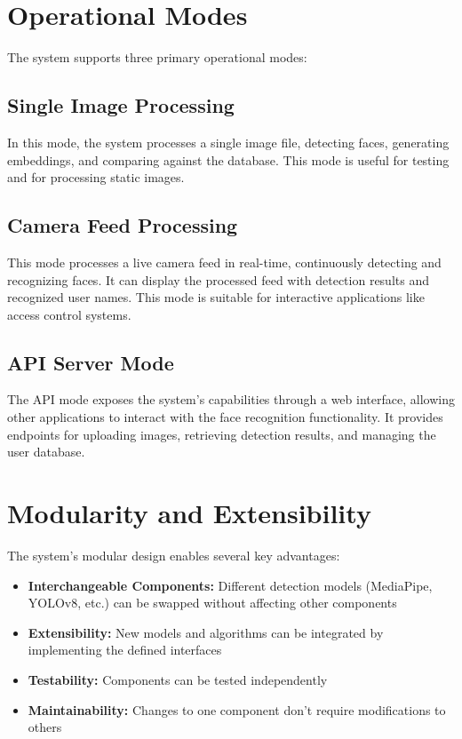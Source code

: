 \section{Operational Modes}
The system supports three primary operational modes:

\subsection{Single Image Processing}
In this mode, the system processes a single image file, detecting faces, generating embeddings, and comparing against the database. This mode is useful for testing and for processing static images.

\subsection{Camera Feed Processing}
This mode processes a live camera feed in real-time, continuously detecting and recognizing faces. It can display the processed feed with detection results and recognized user names. This mode is suitable for interactive applications like access control systems.

\subsection{API Server Mode}
The API mode exposes the system's capabilities through a web interface, allowing other applications to interact with the face recognition functionality. It provides endpoints for uploading images, retrieving detection results, and managing the user database.

\section{Modularity and Extensibility}
The system's modular design enables several key advantages:

\begin{itemize}
    \item \textbf{Interchangeable Components:} Different detection models (MediaPipe, YOLOv8, etc.) can be swapped without affecting other components
    \item \textbf{Extensibility:} New models and algorithms can be integrated by implementing the defined interfaces
    \item \textbf{Testability:} Components can be tested independently
    \item \textbf{Maintainability:} Changes to one component don't require modifications to others
\end{itemize}

